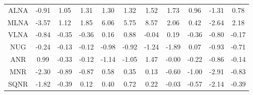 \begin{longtable}{ | c || c | c | c | c | c | c | c | c | c || c |}
ALNA &  \cellcolor[HTML]{FFE7E7} -0.91 &  \cellcolor[HTML]{E7E7FF} 1.05 &  \cellcolor[HTML]{DFDFFF} 1.31 &  \cellcolor[HTML]{DFDFFF} 1.30 &  \cellcolor[HTML]{DFDFFF} 1.32 &  \cellcolor[HTML]{D7D7FF} 1.52 &  \cellcolor[HTML]{D7D7FF} 1.73 &  \cellcolor[HTML]{E7E7FF} 0.96 &  \cellcolor[HTML]{FFDFDF} -1.31 &  \cellcolor[HTML]{EFEFFF} 0.78 \\
MLNA &  \cellcolor[HTML]{FFA7A7} -3.57 &  \cellcolor[HTML]{DFDFFF} 1.12 &  \cellcolor[HTML]{CFCFFF} 1.85 &  \cellcolor[HTML]{6868FF} 6.06 &  \cellcolor[HTML]{7070FF} 5.75 &  \cellcolor[HTML]{2828FF} 8.57 &  \cellcolor[HTML]{CFCFFF} 2.06 &  \cellcolor[HTML]{F7F7FF} 0.42 &  \cellcolor[HTML]{FFBFBF} -2.64 &  \cellcolor[HTML]{C7C7FF} 2.18 \\
VLNA &  \cellcolor[HTML]{FFE7E7} -0.84 &  \cellcolor[HTML]{FFF7F7} -0.35 &  \cellcolor[HTML]{FFF7F7} -0.36 &  \cellcolor[HTML]{F7F7FF} 0.16 &  \cellcolor[HTML]{E7E7FF} 0.88 &  \cellcolor[HTML]{FFFFFF} -0.04 &  \cellcolor[HTML]{F7F7FF} 0.19 &  \cellcolor[HTML]{FFF7F7} -0.36 &  \cellcolor[HTML]{FFE7E7} -0.80 &  \cellcolor[HTML]{FFF7F7} -0.17 \\
NUG &  \cellcolor[HTML]{FFF7F7} -0.24 &  \cellcolor[HTML]{FFFFFF} -0.13 &  \cellcolor[HTML]{FFFFFF} -0.12 &  \cellcolor[HTML]{FFE7E7} -0.98 &  \cellcolor[HTML]{FFE7E7} -0.92 &  \cellcolor[HTML]{FFDFDF} -1.24 &  \cellcolor[HTML]{FFCFCF} -1.89 &  \cellcolor[HTML]{FFFFFF} 0.07 &  \cellcolor[HTML]{FFE7E7} -0.93 &  \cellcolor[HTML]{FFEFEF} -0.71 \\
ANR &  \cellcolor[HTML]{E7E7FF} 0.99 &  \cellcolor[HTML]{FFF7F7} -0.33 &  \cellcolor[HTML]{FFFFFF} -0.12 &  \cellcolor[HTML]{FFDFDF} -1.14 &  \cellcolor[HTML]{FFE7E7} -1.05 &  \cellcolor[HTML]{D7D7FF} 1.47 &  \cellcolor[HTML]{FFFFFF} -0.00 &  \cellcolor[HTML]{FFF7F7} -0.22 &  \cellcolor[HTML]{FFE7E7} -0.86 &  \cellcolor[HTML]{FFFFFF} -0.14 \\
MNR &  \cellcolor[HTML]{FFC7C7} -2.30 &  \cellcolor[HTML]{FFE7E7} -0.89 &  \cellcolor[HTML]{FFE7E7} -0.87 &  \cellcolor[HTML]{EFEFFF} 0.58 &  \cellcolor[HTML]{F7F7FF} 0.35 &  \cellcolor[HTML]{FFFFFF} 0.13 &  \cellcolor[HTML]{FFEFEF} -0.60 &  \cellcolor[HTML]{FFE7E7} -1.00 &  \cellcolor[HTML]{FFB7B7} -2.91 &  \cellcolor[HTML]{FFE7E7} -0.83 \\
SQNR &  \cellcolor[HTML]{FFCFCF} -1.82 &  \cellcolor[HTML]{FFF7F7} -0.39 &  \cellcolor[HTML]{FFFFFF} 0.12 &  \cellcolor[HTML]{F7F7FF} 0.40 &  \cellcolor[HTML]{EFEFFF} 0.72 &  \cellcolor[HTML]{F7F7FF} 0.22 &  \cellcolor[HTML]{FFFFFF} -0.03 &  \cellcolor[HTML]{FFEFEF} -0.57 &  \cellcolor[HTML]{FFC7C7} -2.14 &  \cellcolor[HTML]{FFF7F7} -0.39 \\

\end{longtable}
